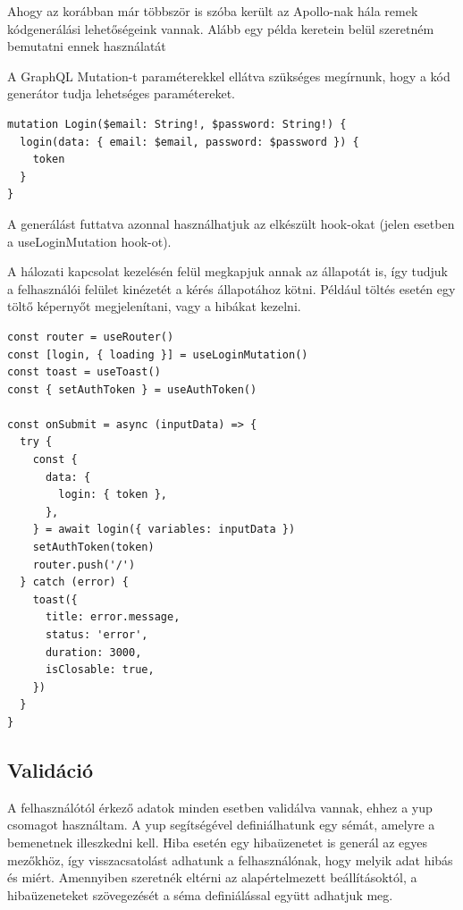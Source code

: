 Ahogy az korábban már többször is szóba került az Apollo-nak hála remek kódgenerálási lehetőségeink vannak.
Alább egy példa keretein belül szeretném bemutatni ennek használatát

A GraphQL Mutation-t paraméterekkel ellátva szükséges megírnunk, hogy a kód generátor tudja lehetséges paramétereket. 
\begin{lstlisting}[style=ES6, caption={GraphQL Shield}]
mutation Login($email: String!, $password: String!) {
  login(data: { email: $email, password: $password }) {
    token
  }
}
\end{lstlisting}

A generálást futtatva azonnal használhatjuk az elkészült hook-okat (jelen esetben a useLoginMutation hook-ot).

A hálozati kapcsolat kezelésén felül megkapjuk annak az állapotát is, így tudjuk a felhasználói felület kinézetét a kérés állapotához kötni.
Például töltés esetén egy töltő képernyőt megjelenítani, vagy a hibákat kezelni.

\begin{lstlisting}[style=ES6, caption={Bejelentkezés kódrészlet}]
const router = useRouter()
const [login, { loading }] = useLoginMutation()
const toast = useToast()
const { setAuthToken } = useAuthToken()

const onSubmit = async (inputData) => {
  try {
    const {
      data: {
        login: { token },
      },
    } = await login({ variables: inputData })
    setAuthToken(token)
    router.push('/')
  } catch (error) {
    toast({
      title: error.message,
      status: 'error',
      duration: 3000,
      isClosable: true,
    })
  }
}
\end{lstlisting}

\subsection{Validáció}
A felhasználótól érkező adatok minden esetben validálva vannak, ehhez a yup csomagot használtam.
A yup segítségével definiálhatunk egy sémát, amelyre a bemenetnek illeszkedni kell. 
Hiba esetén egy hibaüzenetet is generál az egyes mezőkhöz, így visszacsatolást adhatunk a felhasználónak, hogy melyik adat hibás és miért.
Amennyiben szeretnék eltérni az alapértelmezett beállításoktól, a hibaüzeneteket szövegezését a séma definiálással együtt adhatjuk meg.

